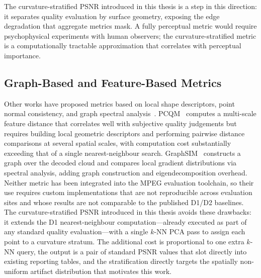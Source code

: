 The curvature-stratified PSNR introduced in this thesis is a step in this
direction: it separates quality evaluation by surface geometry, exposing the
edge degradation that aggregate metrics mask.
A fully perceptual metric would require psychophysical experiments with human
observers; the curvature-stratified metric is a computationally tractable
approximation that correlates with perceptual importance.

\subsection{Graph-Based and Feature-Based Metrics}

Other works have proposed metrics based on local shape descriptors, point
normal consistency, and graph spectral
analysis~\cite{meynet2020pcqm,alexiou2018angular,yang2022graphsim}.
PCQM~\cite{meynet2020pcqm} computes a multi-scale feature distance that
correlates well with subjective quality judgements but requires building
local geometric descriptors and performing pairwise distance comparisons
at several spatial scales, with computation cost substantially exceeding
that of a single nearest-neighbour search.
GraphSIM~\cite{yang2022graphsim} constructs a graph over the decoded cloud
and compares local gradient distributions via spectral analysis, adding
graph construction and eigendecomposition overhead.
Neither metric has been integrated into the MPEG evaluation toolchain,
so their use requires custom implementations that are not reproducible
across evaluation sites and whose results are not comparable to the
published D1/D2 baselines.
The curvature-stratified PSNR introduced in this thesis avoids these
drawbacks: it extends the D1 nearest-neighbour computation---already
executed as part of any standard quality evaluation---with a single $k$-NN
PCA pass to assign each point to a curvature stratum.
The additional cost is proportional to one extra $k$-NN query, the
output is a pair of standard PSNR values that slot directly into existing
reporting tables, and the stratification directly targets the spatially
non-uniform artifact distribution that motivates this work.
